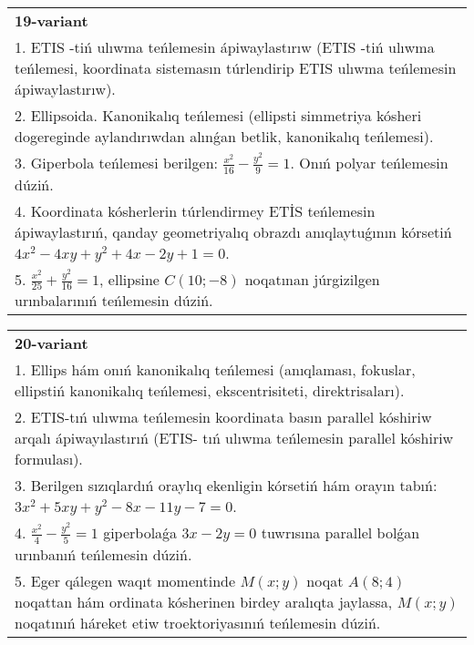 \documentclass{article}
\begin{document}
\begin{tabular}{m{17cm}}
\textbf{19-variant}\\
1. ETIS -tiń ulıwma teńlemesin ápiwaylastırıw (ETIS -tiń ulıwma teńlemesi, koordinata sistemasın túrlendirip ETIS ulıwma teńlemesin ápiwaylastırıw).\\

2. Ellipsoida. Kanonikalıq teńlemesi (ellipsti simmetriya kósheri dogereginde aylandırıwdan alınǵan betlik, kanonikalıq teńlemesi).\\

3. Giperbola teńlemesi berilgen: $\frac{x^{2}}{16}-\frac{y^{2}}{9}=1$. Onıń polyar teńlemesin dúziń.\\

4. Koordinata kósherlerin túrlendirmey ETİS teńlemesin ápiwaylastırıń, qanday geometriyalıq obrazdı anıqlaytuǵının kórsetiń $4x^{2} - 4xy + y^{2} + 4x - 2y + 1 = 0$.  \\

5. $\frac{x^{2}}{25} + \frac{y^{2}}{16} = 1$, ellipsine $C(10; - 8)$ noqatınan júrgizilgen urınbalarınıń teńlemesin dúziń.  
\end{tabular}
\vspace{1cm}


\begin{tabular}{m{17cm}}
\textbf{20-variant}\\
1. Ellips hám onıń kanonikalıq teńlemesi (anıqlaması, fokuslar, ellipstiń kanonikalıq teńlemesi, ekscentrisiteti, direktrisaları).\\

2. ETIS-tıń ulıwma teńlemesin koordinata basın parallel kóshiriw arqalı ápiwayılastırıń (ETIS- tıń ulıwma teńlemesin parallel kóshiriw formulası).\\

3. Berilgen sızıqlardıń oraylıq ekenligin kórsetiń hám orayın tabıń: $3 x^{2}+5 xy+y^{2}-8 x-11 y-7=0$.\\

4. $\frac{x^{2}}{4} - \frac{y^{2}}{5} = 1$ giperbolaǵa $3x - 2y = 0$ tuwrısına parallel bolǵan urınbanıń teńlemesin dúziń.  \\

5. Eger qálegen waqıt momentinde $M(x;y)$ noqat $A(8;4)$ noqattan hám ordinata kósherinen birdey aralıqta jaylassa, $M(x;y)$ noqatınıń háreket etiw troektoriyasınıń teńlemesin dúziń.  
\end{tabular}
\vspace{1cm}
\end{document}
